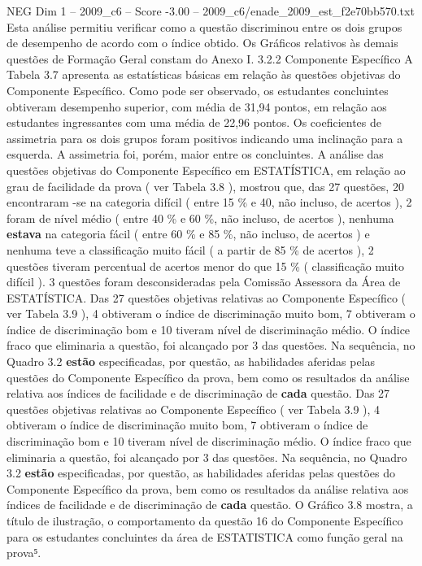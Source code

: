 \begin{textsample}{NEG Dim 1 – 2009\_c6 – Score -3.00 – 2009\_c6/enade\_2009\_est\_f2e70bb570.txt}
Esta análise permitiu verificar como a questão discriminou entre os dois grupos de desempenho de acordo com o índice obtido.
Os Gráficos relativos às demais questões de Formação Geral constam do Anexo I. 3.2.2 Componente Específico A Tabela 3.7 apresenta as estatísticas básicas em relação às questões objetivas do Componente Específico.
Como pode ser observado, os estudantes concluintes obtiveram desempenho superior, com média de 31,94 pontos, em relação aos estudantes ingressantes com uma média de 22,96 pontos.
Os coeficientes de assimetria para os dois grupos foram positivos indicando uma inclinação para a esquerda.
A assimetria foi, porém, maior entre os concluintes.
A análise das questões objetivas do Componente Específico em ESTATÍSTICA, em relação ao grau de facilidade da prova ( ver Tabela 3.8 ), mostrou que, das 27 questões, 20 encontraram -se na categoria difícil ( entre 15 \% e 40, não incluso, de acertos ), 2 foram de nível médio ( entre 40 \% e 60 \%, não incluso, de acertos ), nenhuma \textbf{estava} na categoria fácil ( entre 60 \% e 85 \%, não incluso, de acertos ) e nenhuma teve a classificação muito fácil ( a partir de 85 \% de acertos ), 2 questões tiveram percentual de acertos menor do que 15 \% ( classificação muito difícil ). 3 questões foram desconsideradas pela Comissão Assessora da Área de ESTATÍSTICA.
Das 27 questões objetivas relativas ao Componente Específico ( ver Tabela 3.9 ), 4 obtiveram o índice de discriminação muito bom, 7 obtiveram o índice de discriminação bom e 10 tiveram nível de discriminação médio.
O índice fraco que eliminaria a questão, foi alcançado por 3 das questões.
Na sequência, no Quadro 3.2 \textbf{estão} especificadas, por questão, as habilidades aferidas pelas questões do Componente Específico da prova, bem como os resultados da análise relativa aos índices de facilidade e de discriminação de \textbf{cada} questão.
Das 27 questões objetivas relativas ao Componente Específico ( ver Tabela 3.9 ), 4 obtiveram o índice de discriminação muito bom, 7 obtiveram o índice de discriminação bom e 10 tiveram nível de discriminação médio.
O índice fraco que eliminaria a questão, foi alcançado por 3 das questões.
Na sequência, no Quadro 3.2 \textbf{estão} especificadas, por questão, as habilidades aferidas pelas questões do Componente Específico da prova, bem como os resultados da análise relativa aos índices de facilidade e de discriminação de \textbf{cada} questão.
O Gráfico 3.8 mostra, a título de ilustração, o comportamento da questão 16 do Componente Específico para os estudantes concluintes da área de ESTATISTICA como função geral na prova⁵.

\end{textsample}
